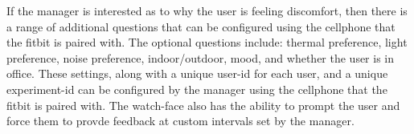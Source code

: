 If the manager is interested as to why the user is feeling discomfort, then there is a range of additional questions that can be configured using the cellphone that the fitbit is paired with. The optional questions include: thermal preference, light preference, noise preference, indoor/outdoor, mood, and whether the user is in office. These settings, along with a unique user-id for each user, and a unique experiment-id can be configured by the manager using the cellphone that the fitbit is paired with. The watch-face also has the ability to prompt the user and force them to provde feedback at custom intervals set by the manager.










